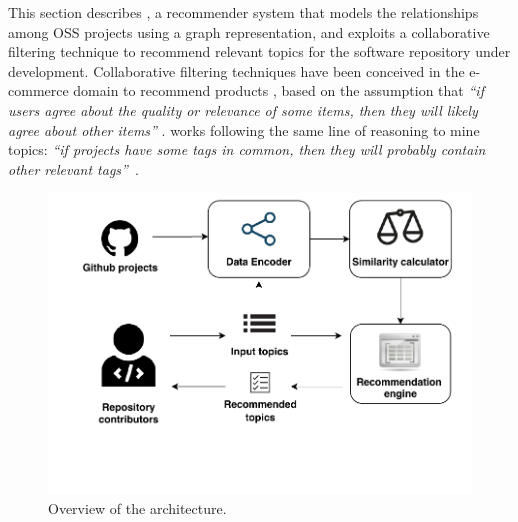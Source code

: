 This section describes \TF, %
a recommender system %
that models the relationships among OSS projects using a graph representation, 
and exploits a collaborative filtering technique 
\cite{Schafer:2007:CFR:1768197.1768208} to recommend relevant \GH topics for 
the software repository under development. Collaborative filtering techniques 
have 
been conceived in the e-commerce domain %
to recommend products %
\cite{Linden:2003:ARI:642462.642471}, based on the assumption that \emph{``if users agree about the quality or relevance of some items, then they will likely agree about other items''} \cite{Schafer:2007:CFR:1768197.1768208}. 
\TF works %
following the same line of reasoning to mine \GH topics: \emph{``if projects have some tags in common, then they will probably contain other relevant tags''}~\cite{NGUYEN2020110460}.

\begin{figure}[t!]
	\centering
	\includegraphics[width=\linewidth]{figs/TopFilter.pdf}
	\caption{Overview of the \TF architecture.}%
	\label{fig:TopFilterArchitecture}
\end{figure}


